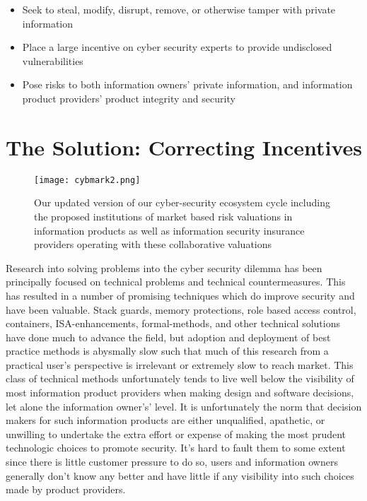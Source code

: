 \documentclass[conference]{IEEEtran}
\begin{document}
\begin{itemize}
\item Seek to steal, modify, disrupt, remove, or otherwise tamper with private information
\item Place a large incentive on cyber security experts to provide undisclosed vulnerabilities
\item Pose risks to both information owners’ private information, and information product providers’ product integrity and security
\end{itemize}


 \section{The Solution: Correcting Incentives}

 \begin{figure*}[ht!]
  \centering
      \texttt{[image: cybmark2.png]}
        \caption{Our updated version of our cyber-security ecosystem cycle including the proposed institutions of market based risk valuations in information products as well as information security insurance providers operating with these collaborative valuations}
    \label{fig:system2}
\end{figure*}

 Research into solving problems into the cyber security dilemma has been principally focused on technical problems and technical countermeasures.  This has resulted in a number of promising techniques which do improve security and have been valuable.   Stack guards, memory protections, role based access control, containers, ISA-enhancements, formal-methods, and other technical solutions have done much to advance the field, but adoption and deployment of best practice methods is abysmally slow such that much of this research from a practical user’s perspective is irrelevant or extremely slow to reach market.   This class of technical methods unfortunately tends to live well below the visibility of most information product providers when making design and software decisions, let alone the information owner's’ level.  It is unfortunately the norm that decision makers for such information products are either unqualified, apathetic, or unwilling to undertake the extra effort or expense of making the most prudent technologic choices to promote security.  It's hard to fault them to some extent since there is little customer pressure to do so, users and information owners generally don’t know any better and have little if any visibility into such choices made by product providers.
 
\end{document}

